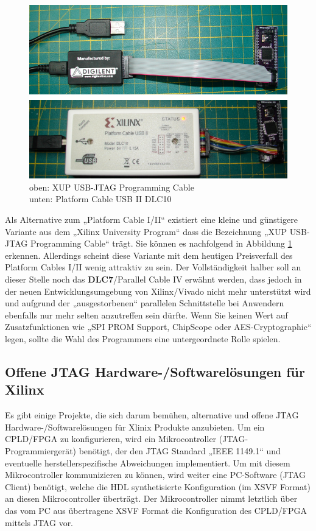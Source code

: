 \documentclass{article}
\begin{document}
\begin{figure}[!h]
	\centering
	\includegraphics[width=1\linewidth]{Figures/JTAG_Programmer_uebersicht}
	\caption{oben: XUP USB-JTAG Programming Cable
		\\\hspace*{2cm} unten: Platform Cable USB II DLC10}
	\label{fig:JTAG_Cable}
\end{figure}

Als Alternative zum „Platform Cable I/II“ existiert eine kleine und günstigere Variante aus dem „Xilinx University Program“ dass die Bezeichnung „XUP USB-JTAG Programming Cable“ trägt. Sie können es nachfolgend in Abbildung \ref{fig:JTAG_Cable} erkennen. Allerdings scheint diese Variante mit dem heutigen Preisverfall des Platform Cables I/II wenig attraktiv zu sein. 
Der Vollständigkeit halber soll an dieser Stelle noch das \textbf{DLC7}/Parallel Cable IV erwähnt werden, dass jedoch in der neuen Entwicklungsumgebung von Xilinx/Vivado nicht mehr unterstützt wird \autocite{AR_54136} und aufgrund der „ausgestorbenen“ parallelen Schnittstelle bei Anwendern ebenfalls nur mehr selten anzutreffen sein dürfte. Wenn Sie keinen Wert auf Zusatzfunktionen wie „SPI PROM Support, ChipScope oder AES-Cryptographic“ legen, sollte die Wahl des Programmers eine untergeordnete Rolle spielen.

\newpage

\subsection{Offene JTAG Hardware-/Softwarelösungen für Xilinx}
Es gibt einige Projekte, die sich darum bemühen, alternative und offene JTAG Hardware-/Softwarelösungen für Xlinix Produkte anzubieten.
Um ein CPLD/FPGA zu konfigurieren, wird ein Mikrocontroller (JTAG-Programmiergerät) benötigt, der den JTAG Standard „IEEE 1149.1“ und eventuelle herstellerspezifische Abweichungen implementiert. 
Um mit diesem Mikrocontroller kommunizieren zu können, wird weiter eine PC-Software (JTAG Client) benötigt, welche die HDL synthetisierte Konfiguration (im XSVF Format) an diesen Mikrocontroller überträgt. Der Mikrocontroller nimmt letztlich über das vom PC aus übertragene XSVF Format die Konfiguration des CPLD/FPGA mittels JTAG vor.
\end{document}
